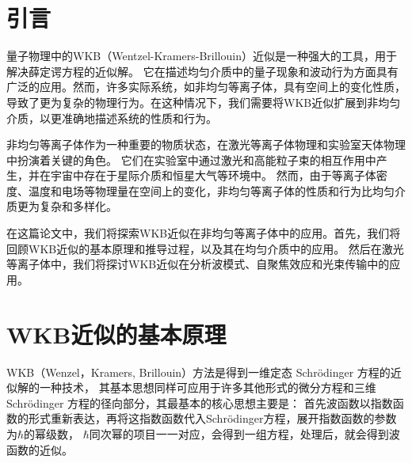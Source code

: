 \documentclass[12pt, a4paper, oneside]{ctexart}
\title{}
\date{\today}
\author{202011010101物理2001孙陶庵}
\begin{document}
\begin{spacing}{2.0}
\tableofcontents
\maketitle

\section{引言}
量子物理中的WKB（Wentzel-Kramers-Brillouin）近似是一种强大的工具，用于解决薛定谔方程的近似解。
它在描述均匀介质中的量子现象和波动行为方面具有广泛的应用。然而，许多实际系统，如非均匀等离子体，具有空间上的变化性质，
导致了更为复杂的物理行为。在这种情况下，我们需要将WKB近似扩展到非均匀介质，以更准确地描述系统的性质和行为。

非均匀等离子体作为一种重要的物质状态，在激光等离子体物理和实验室天体物理中扮演着关键的角色。
它们在实验室中通过激光和高能粒子束的相互作用中产生，并在宇宙中存在于星际介质和恒星大气等环境中。
然而，由于等离子体密度、温度和电场等物理量在空间上的变化，非均匀等离子体的性质和行为比均匀介质更为复杂和多样化。

在这篇论文中，我们将探索WKB近似在非均匀等离子体中的应用。首先，我们将回顾WKB近似的基本原理和推导过程，以及其在均匀介质中的应用。
然后在激光等离子体中，我们将探讨WKB近似在分析波模式、自聚焦效应和光束传输中的应用。

\section{WKB近似的基本原理}
WKB（Wenzel，Kramers, Brillouin）方法是得到一维定态 Schrödinger 方程的近似解的一种技术，
其基本思想同样可应用于许多其他形式的微分方程和三维 Schrödinger 方程的径向部分，其最基本的核心思想主要是：
首先波函数以指数函数的形式重新表达，再将这指数函数代入Schrödinger方程，展开指数函数的参数为$\hbar$的幂级数，
$\hbar$同次幂的项目一一对应，会得到一组方程，处理后，就会得到波函数的近似。

\end{spacing}
\end{document}
